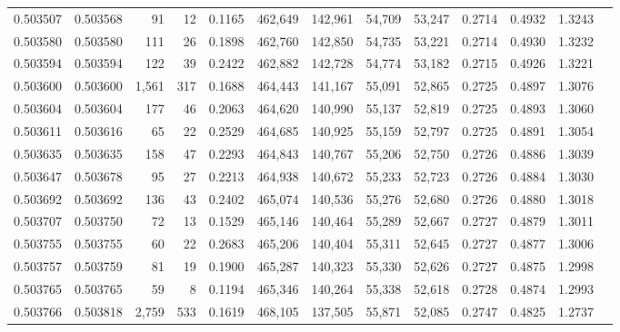\begin{tabular}{rrrrrrrrrrrrr}
0.503507 & 0.503568 &    91 &    12 &                                     0.1165 & 462,649 & 142,961 &  54,709 &  53,247 & 0.2714 & 0.4932 & 1.3243 \\
0.503580 & 0.503580 &   111 &    26 &                                     0.1898 & 462,760 & 142,850 &  54,735 &  53,221 & 0.2714 & 0.4930 & 1.3232 \\
0.503594 & 0.503594 &   122 &    39 &                                     0.2422 & 462,882 & 142,728 &  54,774 &  53,182 & 0.2715 & 0.4926 & 1.3221 \\
0.503600 & 0.503600 & 1,561 &   317 &                                     0.1688 & 464,443 & 141,167 &  55,091 &  52,865 & 0.2725 & 0.4897 & 1.3076 \\
0.503604 & 0.503604 &   177 &    46 &                                     0.2063 & 464,620 & 140,990 &  55,137 &  52,819 & 0.2725 & 0.4893 & 1.3060 \\
0.503611 & 0.503616 &    65 &    22 &                                     0.2529 & 464,685 & 140,925 &  55,159 &  52,797 & 0.2725 & 0.4891 & 1.3054 \\
0.503635 & 0.503635 &   158 &    47 &                                     0.2293 & 464,843 & 140,767 &  55,206 &  52,750 & 0.2726 & 0.4886 & 1.3039 \\
0.503647 & 0.503678 &    95 &    27 &                                     0.2213 & 464,938 & 140,672 &  55,233 &  52,723 & 0.2726 & 0.4884 & 1.3030 \\
0.503692 & 0.503692 &   136 &    43 &                                     0.2402 & 465,074 & 140,536 &  55,276 &  52,680 & 0.2726 & 0.4880 & 1.3018 \\
0.503707 & 0.503750 &    72 &    13 &                                     0.1529 & 465,146 & 140,464 &  55,289 &  52,667 & 0.2727 & 0.4879 & 1.3011 \\
0.503755 & 0.503755 &    60 &    22 &                                     0.2683 & 465,206 & 140,404 &  55,311 &  52,645 & 0.2727 & 0.4877 & 1.3006 \\
0.503757 & 0.503759 &    81 &    19 &                                     0.1900 & 465,287 & 140,323 &  55,330 &  52,626 & 0.2727 & 0.4875 & 1.2998 \\
0.503765 & 0.503765 &    59 &     8 &                                     0.1194 & 465,346 & 140,264 &  55,338 &  52,618 & 0.2728 & 0.4874 & 1.2993 \\
0.503766 & 0.503818 & 2,759 &   533 &                                     0.1619 & 468,105 & 137,505 &  55,871 &  52,085 & 0.2747 & 0.4825 & 1.2737 \\

\end{tabular}
